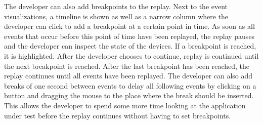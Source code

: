 The developer can also add breakpoints to the replay. Next to the event visualizations, a timeline is shown as well as a narrow column where the developer can click to add a breakpoint at a certain point in time. As soon as all events that occur before this point of time have been replayed, the replay pauses and the developer can inspect the state of the devices. If a breakpoint is reached, it is highlighted. After the developer chooses to continue, replay is continued until the next breakpoint is reached. After the last breakpoint has been reached, the replay continues until all events have been replayed. The developer can also add breaks of one second between events to delay all following events by clicking on a button and dragging the mouse to the place where the break should be inserted. This allows the developer to spend some more time looking at the application under test before the replay continues without having to set breakpoints. 